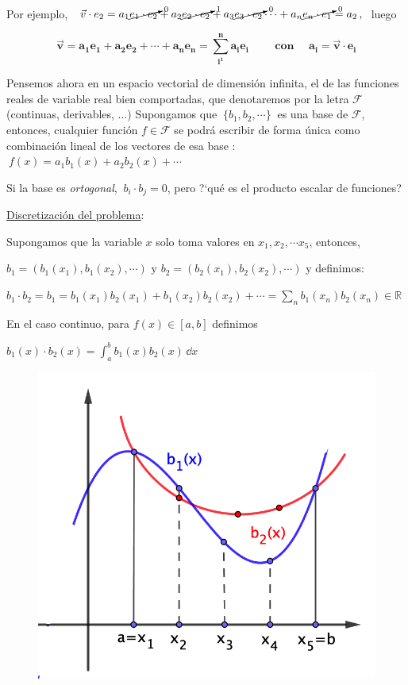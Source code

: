 Por ejemplo, $\ \ \vec v \cdot e_2 = a_1 \cancelto{0}{e_1 \cdot e_2} +a_2 \cancelto{1}{e_2 \cdot e_2}+ a_3 \cancelto{0}{e_3 \cdot e_2} \cdots + a_n \cancelto{0}{e_n \cdot e_1 }=a_2\, , \ $ luego

\vspace{-3mm}

$$\boldsymbol{ \vec v= a_1e_1+a_2e_2+ \cdots + a_ne_n=\displaystyle \sum_{i^1}^n a_i e_i \qquad \text{ con } \quad a_i=\vec v \cdot e_i }$$

 
\vspace{-3mm} Pensemos ahora en un espacio vectorial de dimensión infinita, el de las funciones reales de variable real bien comportadas, que denotaremos por la letra $\mathcal F$ \textcolor{gris}{(continuas, derivables, ...)}
Supongamos que $\ \{b_1,b_2, \cdots \} \ $ es una base de $\mathcal F$, entonces, cualquier función $f\in \mathcal F$ se podrá escribir de forma única como combinación lineal de los vectores de esa base : $\ f(x)=a_1b_1(x)+a_2b_2(x)+\cdots $

Si la base es \emph{ortogonal}, $\ b_i\cdot b_j = 0$, pero ?`qué es el producto escalar de funciones?


\begin{multicols}{2}

\underline{Discretización del problema}:

Supongamos que la variable $x$ solo toma valores en $x_1,x_2,\cdots x_5$, entonces, 

$b_1=(b_1(x_1),b_1(x_2),\cdots ) \text { y } b_2=(b_2(x_1),b_2(x_2),\cdots ) $ y definimos:

$b_1\cdot b_2=b_1=b_1(x_1)b_2(x_1) + b_1(x_2) b_2(x_2) +\cdots  = \sum_n b_1(x_n)b_2(x_n)\in \mathbb R$

En el caso continuo, para $f(x) \in [a,b]$ definimos

$b_1(x)\cdot b_2(x) =\displaystyle \int_a^b b_1(x)b_2(x) \, \dd x$
\begin{figure}[H]
	\centering
	\includegraphics[width=.45\textwidth]{imagenes/apendices-01-12.png}
\end{figure}	
\end{multicols}



